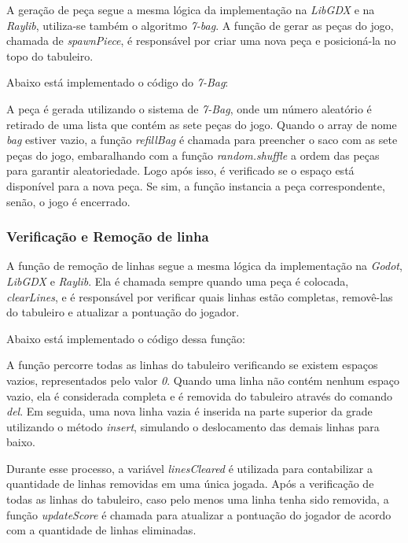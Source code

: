 A geração de peça segue a mesma lógica da implementação na \textit{LibGDX} e na \textit{Raylib}, utiliza-se também o algoritmo \textit{7-bag}. A função de gerar as peças do jogo, chamada de \textit{spawnPiece}, é responsável por criar uma nova peça e posicioná-la no topo do tabuleiro. 

Abaixo está implementado o código do \textit{7-Bag}:


A peça é gerada utilizando o sistema de \textit{7-Bag}, onde um número aleatório é retirado de uma lista que contém as sete peças do jogo. Quando o array de nome \textit{bag} estiver vazio, a função \textit{refillBag} é chamada para preencher o saco com as sete peças do jogo, embaralhando com a função \textit{random.shuffle} a ordem das peças para garantir aleatoriedade.
Logo após isso, é verificado se o espaço está disponível para a nova peça. Se sim, a função instancia a peça correspondente, senão, o jogo é encerrado.

\subsubsection{Verificação e Remoção de linha}

A função de remoção de linhas segue a mesma lógica da implementação na \textit{Godot}, \textit{LibGDX} e \textit{Raylib}. Ela é chamada sempre quando uma peça é colocada, \textit{clearLines}, e é responsável por verificar quais linhas estão completas, removê-las do tabuleiro e atualizar a pontuação do jogador. 

Abaixo está implementado o código dessa função:


A função percorre todas as linhas do tabuleiro verificando se existem espaços vazios, representados pelo valor \textit{0}. Quando uma linha não contém nenhum espaço vazio, ela é considerada completa e é removida do tabuleiro através do comando \textit{del}. Em seguida, uma nova linha vazia é inserida na parte superior da grade utilizando o método \textit{insert}, simulando o deslocamento das demais linhas para baixo.

Durante esse processo, a variável \textit{linesCleared} é utilizada para contabilizar a quantidade de linhas removidas em uma única jogada. Após a verificação de todas as linhas do tabuleiro, caso pelo menos uma linha tenha sido removida, a função \textit{updateScore} é chamada para atualizar a pontuação do jogador de acordo com a quantidade de linhas eliminadas.

